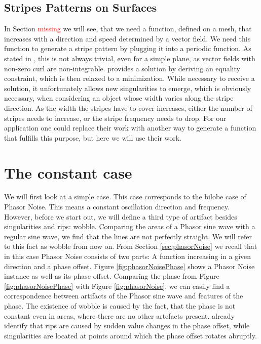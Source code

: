 \documentclass{utue} %
\begin{document}
\subsection{Stripes Patterns on Surfaces}
In Section \textcolor{red}{missing} we will see, that we need a function, defined on a mesh, that increases with a direction and speed determined by a vector field. We need this function to generate a stripe pattern by plugging it into a periodic function. As stated in \cite{stripes}, this is not always trivial, even for a simple plane, as vector fields with non-zero curl are non-integrable. \cite{stripes} provides a solution by deriving an equality constraint, which is then relaxed to a minimization. While necessary to receive a solution, it unfortunately allows new singularities to emerge, which is obviously necessary, when considering an object whose width varies along the stripe direction. As the width the stripes have to cover increases, either the number of stripes needs to increase, or the stripe frequency needs to drop. For our application one could replace their work with another way to generate a function that fulfills this purpose, but here we will use their work.

\section{The constant case}
We will first look at a simple case. This case corresponds to the bilobe case of Phasor Noise. This means a constant oscillation direction and frequency. However, before we start out, we will define a third type of artifact besides singularities and rips: wobble. Comparing the areas of a Phasor sine wave with a regular sine wave, we find that the lines are not perfectly straight. We will refer to this fact as wobble from now on. From Section \ref{sec:phasorNoise} we recall that in this case Phasor Noise consists of two parts: A function increasing in a given direction and a phase offset. Figure \ref{fig:phasorNoisePhase} shows a Phasor Noise instance as well as its phase offset. Comparing the phase from Figure \ref{fig:phasorNoisePhase} with Figure \ref{fig:phasorNoise}, we can easily find a correspondence between artifacts of the Phasor sine wave and features of the phase. The existence of wobble is caused by the fact, that the phase is not constant even in areas, where there are no other artefacts present. \citeauthor{phasorNoise} already identify that rips are caused by sudden value changes in the phase offset, while singularities are located at points around which the phase offset rotates abruptly.\\
\end{document}
